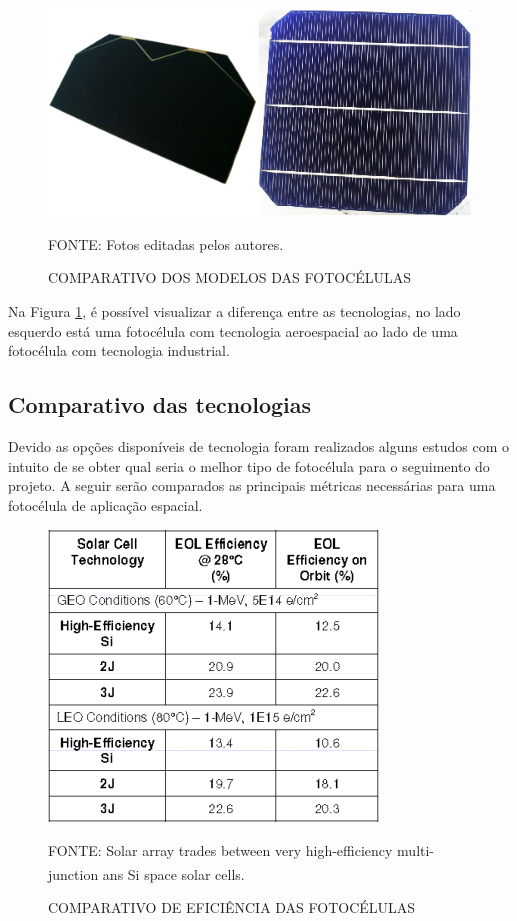 \documentclass[
	12pt,				%
	openright,			%
	oneside,			%
	a4paper,			%
	english,			%
	french,				%
	spanish,			%
	brazil,				%
	oldfontcommands
	]{abntex2}
\begin{document}
	\begin{figure}[th]
		\caption{COMPARATIVO DOS MODELOS DAS FOTOCÉLULAS}
		\label{Fig_cells}
		\centering
		\includegraphics[width=0.7\linewidth]{./figs/cells}
			
		\begin{small}
			FONTE: Fotos editadas pelos autores.
		\end{small}		
	\end{figure}
	
	Na Figura \ref{Fig_cells}, é possível visualizar a diferença entre as tecnologias, no lado esquerdo está uma fotocélula com tecnologia aeroespacial ao lado de uma fotocélula com tecnologia industrial.
	
\subsection[Comparativo das tecnologias]{Comparativo das tecnologias}

	Devido as opções disponíveis de tecnologia foram realizados alguns estudos com o intuito de se obter qual seria o melhor tipo de fotocélula para o seguimento do projeto. A seguir serão comparados as principais métricas necessárias para uma fotocélula de aplicação espacial.
	
	\begin{figure}[th]
		\caption{COMPARATIVO DE EFICIÊNCIA DAS FOTOCÉLULAS}
		\label{Fig_cell_comp1}
		\centering
		\includegraphics[width=0.6\linewidth]{./figs/cell_comp1}
			
		\begin{small}
			FONTE: Solar array trades between very high-efficiency multi-junction ans Si space solar cells.\textsuperscript{\cite{Fatemi}}
		\end{small}		
	\end{figure}
	
\end{document}
